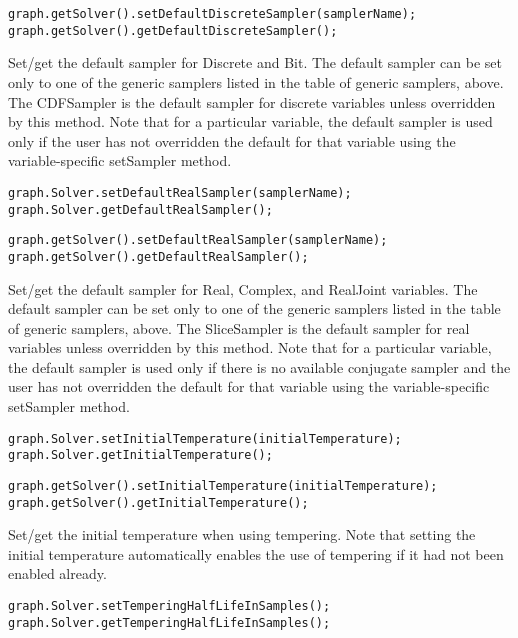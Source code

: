 \ifjava
\begin{lstlisting}
graph.getSolver().setDefaultDiscreteSampler(samplerName);
graph.getSolver().getDefaultDiscreteSampler();
\end{lstlisting}
\fi

Set/get the default sampler for Discrete and Bit.  The default sampler can be set only to one of the generic samplers listed in the table of generic samplers, above.  The CDFSampler is the default sampler for discrete variables unless overridden by this method.  Note that for a particular variable, the default sampler is used only if the user has not overridden the default for that variable using the variable-specific setSampler method.

\ifmatlab
\begin{lstlisting}
graph.Solver.setDefaultRealSampler(samplerName);
graph.Solver.getDefaultRealSampler();
\end{lstlisting}
\fi

\ifjava
\begin{lstlisting}
graph.getSolver().setDefaultRealSampler(samplerName);
graph.getSolver().getDefaultRealSampler();
\end{lstlisting}
\fi

Set/get the default sampler for Real, Complex, and RealJoint variables.  The default sampler can be set only to one of the generic samplers listed in the table of generic samplers, above.  The SliceSampler is the default sampler for real variables unless overridden by this method.  Note that for a particular variable, the default sampler is used only if there is no available conjugate sampler and the user has not overridden the default for that variable using the variable-specific setSampler method.


\ifmatlab
\begin{lstlisting}
graph.Solver.setInitialTemperature(initialTemperature);
graph.Solver.getInitialTemperature();
\end{lstlisting}
\fi

\ifjava
\begin{lstlisting}
graph.getSolver().setInitialTemperature(initialTemperature);
graph.getSolver().getInitialTemperature();
\end{lstlisting}
\fi

Set/get the initial temperature when using tempering. Note that setting the initial temperature automatically enables the use of tempering if it had not been enabled already.

\ifmatlab
\begin{lstlisting}
graph.Solver.setTemperingHalfLifeInSamples();
graph.Solver.getTemperingHalfLifeInSamples();
\end{lstlisting}
\fi

